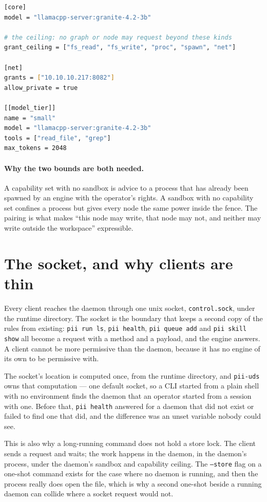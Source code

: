 \begin{lstlisting}[language=bash]
[core]
model = "llamacpp-server:granite-4.2-3b"

# the ceiling: no graph or node may request beyond these kinds
grant_ceiling = ["fs_read", "fs_write", "proc", "spawn", "net"]

[net]
grants = ["10.10.10.217:8082"]
allow_private = true

[[model_tier]]
name = "small"
model = "llamacpp-server:granite-4.2-3b"
tools = ["read_file", "grep"]
max_tokens = 2048
\end{lstlisting}

\paragraph{Why the two bounds are both needed.} A capability set with no sandbox is advice to
a process that has already been spawned by an engine with the operator's rights. A sandbox
with no capability set confines a process but gives every node the same power inside the
fence. The pairing is what makes ``this node may write, that node may not, and neither may
write outside the workspace'' expressible.

\section{The socket, and why clients are thin}

Every client reaches the daemon through one unix socket, \texttt{control.sock}, under the
runtime directory. The socket is the boundary that keeps a second copy of the rules from
existing: \texttt{pii run ls}, \texttt{pii health}, \texttt{pii queue add} and \texttt{pii
skill show} all become a request with a method and a payload, and the engine answers. A client
cannot be more permissive than the daemon, because it has no engine of its own to be
permissive with.

The socket's location is computed once, from the runtime directory, and \texttt{pii-uds} owns
that computation --- one default socket, so a CLI started from a plain shell with no
environment finds the daemon that an operator started from a session with one. Before that,
\texttt{pii health} answered for a daemon that did not exist or failed to find one that did,
and the difference was an unset variable nobody could see.

This is also why a long-running command does not hold a store lock. The client sends a request
and waits; the work happens in the daemon, in the daemon's process, under the daemon's sandbox
and capability ceiling. The \texttt{--store} flag on a one-shot command exists for the case
where no daemon is running, and then the process really does open the file, which is why a
second one-shot beside a running daemon can collide where a socket request would not.

